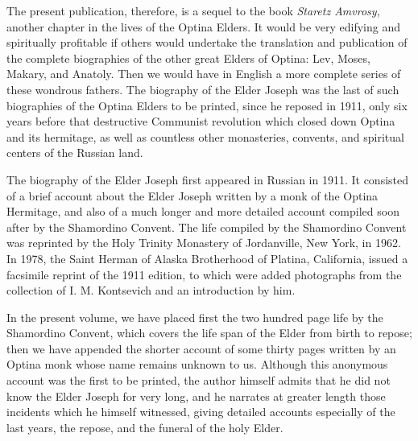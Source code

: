 The present publication, therefore, is a sequel to the book \textit{Staretz Amvrosy}, another chapter in the lives of the Optina Elders. It would be very edifying and spiritually profitable if others would undertake the translation and publication of the complete biographies of the other great Elders of Optina: Lev, Moses, Makary, and Anatoly. Then we would have in English a more complete series of these wondrous fathers. The biography of the Elder Joseph was the last of such biographies of the Optina Elders to be printed, since he reposed in 1911, only six years before that destructive Communist revolution which closed down Optina and its hermitage, as well as countless other monasteries, convents, and spiritual centers of the Russian land.

The biography of the Elder Joseph first appeared in Russian in 1911. It consisted of a brief account about the Elder Joseph written by a monk of the Optina Hermitage, and also of a much longer and more detailed account compiled soon after by the Shamordino Convent. The life compiled by the Shamordino Convent was reprinted by the Holy Trinity Monastery of Jordanville, New York, in 1962. In 1978, the Saint Herman of Alaska Brotherhood of Platina, California, issued a facsimile reprint of the 1911 edition, to which were added photographs from the collection of I. M. Kontsevich and an introduction by him.

In the present volume, we have placed first the two hundred page life by the Shamordino Convent, which covers the life span of the Elder from birth to repose; then we have appended the shorter account of some thirty pages written by an Optina monk whose name remains unknown to us. Although this anonymous account was the first to be printed, the author himself admits that he did not know the Elder Joseph for very long, and he narrates at greater length those incidents which he himself witnessed, giving detailed accounts especially of the last years, the repose, and the funeral of the holy Elder.

